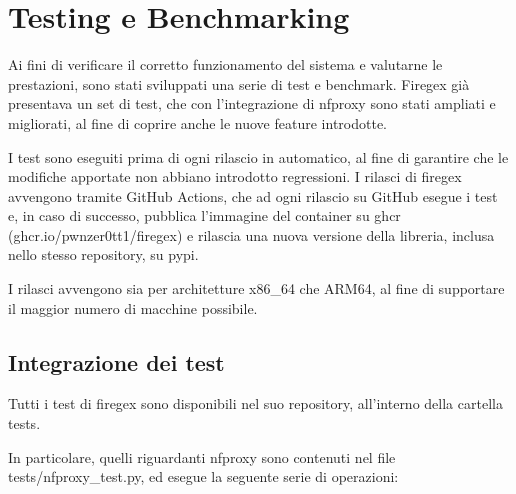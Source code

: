 \chapter{Testing e Benchmarking}\label{chap:tests}

Ai fini di verificare il corretto funzionamento del sistema e valutarne le prestazioni, sono stati sviluppati una serie di test e benchmark. Firegex già presentava un set di test, che con l'integrazione di \gls{nfproxy} sono stati ampliati e migliorati, al fine di coprire anche le nuove feature introdotte.

I test sono eseguiti prima di ogni rilascio in automatico, al fine di garantire che le modifiche apportate non abbiano introdotto regressioni. I rilasci di firegex avvengono tramite GitHub Actions, che ad ogni rilascio su GitHub esegue i test e, in caso di successo, pubblica l'immagine del container su \gls{ghcr} (ghcr.io/pwnzer0tt1/firegex) e rilascia una nuova versione della libreria, inclusa nello stesso repository, su \gls{pypi}.

I rilasci avvengono sia per architetture x86\_64 che ARM64, al fine di supportare il maggior numero di macchine possibile.

\section{Integrazione dei test}

Tutti i test di firegex sono disponibili nel suo repository, all'interno della cartella tests.

In particolare, quelli riguardanti \gls{nfproxy} sono contenuti nel file tests/nfproxy\_test.py, ed esegue la seguente serie di operazioni:

